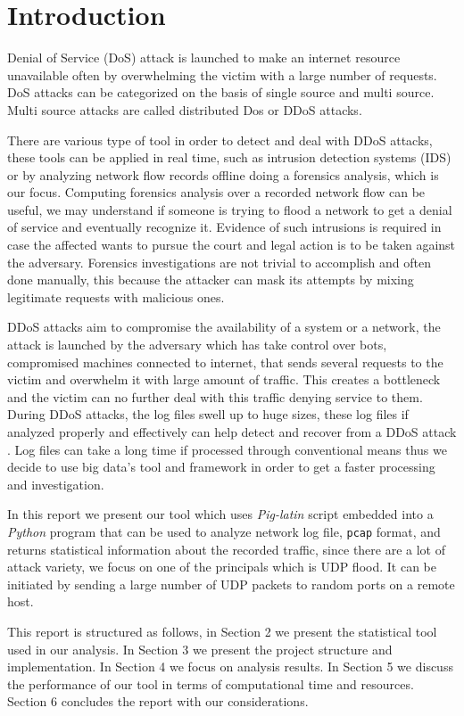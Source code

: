 \section{Introduction}
Denial of Service (DoS) attack is launched to make an internet resource unavailable often by overwhelming the victim with a large number of requests. DoS attacks can be categorized on the basis of single source and multi source. Multi source attacks are called distributed Dos or DDoS attacks\cite{ddos_forensics}.
 
There are various type of tool in order to detect and deal with DDoS attacks, these tools can be applied in real time, such as intrusion detection systems (IDS) or by analyzing network flow records offline doing a forensics analysis, which is our focus.
Computing forensics analysis over a recorded network flow can be useful, we may understand if someone is trying to flood a network to get a denial of service and eventually recognize it.
Evidence of such intrusions is required in case the affected wants to pursue the court and legal action is to be taken against the adversary.
Forensics investigations are not trivial to accomplish and often done manually, this because the attacker can mask its attempts by mixing legitimate requests with malicious ones.

DDoS attacks aim to compromise the availability of a system or a network, the attack is launched by the adversary which has take control over bots, compromised machines connected to internet, that sends several requests to the victim and overwhelm it with large amount of traffic. This creates a bottleneck and the victim can no further deal with this traffic denying service to them.
During DDoS attacks, the log files swell up to huge sizes, these log files if analyzed properly and effectively can help detect and recover from a DDoS attack \cite{ddos_forensics}. Log files can take a long time if processed through conventional means thus we decide to use big data's tool and framework in order to get a faster processing and investigation.

In this report we present our tool which uses \textit{Pig-latin} script embedded into a \textit{Python} program that can be used to analyze network log file, \texttt{pcap} format\cite{wireshrk_pcap}, and returns statistical information about the recorded traffic, since there are a lot of attack variety, we focus on one of the principals which is UDP flood. 
It can be initiated by sending a large number of UDP packets to random ports on a remote host.

This report is structured as follows, in Section 2 we present the statistical tool used in our analysis. In Section 3 we present the project structure and implementation. In Section 4 we focus on analysis results. In Section 5 we discuss the performance of our tool in terms of computational time and resources. Section 6 concludes the report with our considerations.  